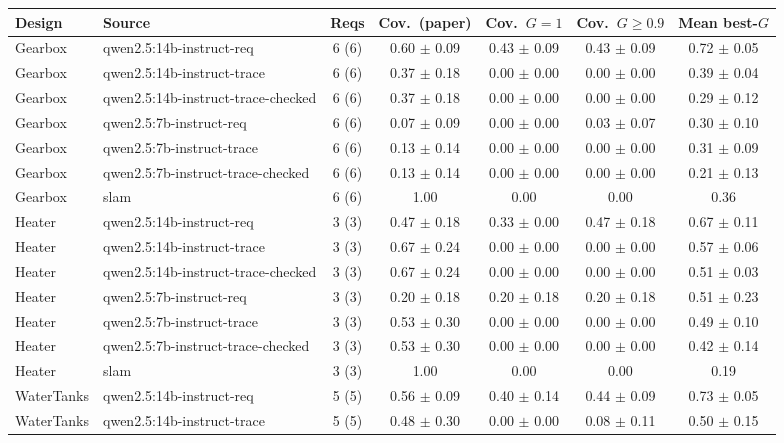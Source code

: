 \begin{tabular}{llccccc}
\toprule
Design & Source & Reqs & Cov.\ (paper) & Cov.\ $G{=}1$ & Cov.\ $G{\geq}0.9$ & Mean best-$G$ \\
\midrule
Gearbox & qwen2.5:14b-instruct-req & 6 (6) & 0.60 $\pm$ 0.09 & 0.43 $\pm$ 0.09 & 0.43 $\pm$ 0.09 & 0.72 $\pm$ 0.05 \\
Gearbox & qwen2.5:14b-instruct-trace & 6 (6) & 0.37 $\pm$ 0.18 & 0.00 $\pm$ 0.00 & 0.00 $\pm$ 0.00 & 0.39 $\pm$ 0.04 \\
Gearbox & qwen2.5:14b-instruct-trace-checked & 6 (6) & 0.37 $\pm$ 0.18 & 0.00 $\pm$ 0.00 & 0.00 $\pm$ 0.00 & 0.29 $\pm$ 0.12 \\
Gearbox & qwen2.5:7b-instruct-req & 6 (6) & 0.07 $\pm$ 0.09 & 0.00 $\pm$ 0.00 & 0.03 $\pm$ 0.07 & 0.30 $\pm$ 0.10 \\
Gearbox & qwen2.5:7b-instruct-trace & 6 (6) & 0.13 $\pm$ 0.14 & 0.00 $\pm$ 0.00 & 0.00 $\pm$ 0.00 & 0.31 $\pm$ 0.09 \\
Gearbox & qwen2.5:7b-instruct-trace-checked & 6 (6) & 0.13 $\pm$ 0.14 & 0.00 $\pm$ 0.00 & 0.00 $\pm$ 0.00 & 0.21 $\pm$ 0.13 \\
Gearbox & slam & 6 (6) & 1.00 & 0.00 & 0.00 & 0.36 \\
Heater & qwen2.5:14b-instruct-req & 3 (3) & 0.47 $\pm$ 0.18 & 0.33 $\pm$ 0.00 & 0.47 $\pm$ 0.18 & 0.67 $\pm$ 0.11 \\
Heater & qwen2.5:14b-instruct-trace & 3 (3) & 0.67 $\pm$ 0.24 & 0.00 $\pm$ 0.00 & 0.00 $\pm$ 0.00 & 0.57 $\pm$ 0.06 \\
Heater & qwen2.5:14b-instruct-trace-checked & 3 (3) & 0.67 $\pm$ 0.24 & 0.00 $\pm$ 0.00 & 0.00 $\pm$ 0.00 & 0.51 $\pm$ 0.03 \\
Heater & qwen2.5:7b-instruct-req & 3 (3) & 0.20 $\pm$ 0.18 & 0.20 $\pm$ 0.18 & 0.20 $\pm$ 0.18 & 0.51 $\pm$ 0.23 \\
Heater & qwen2.5:7b-instruct-trace & 3 (3) & 0.53 $\pm$ 0.30 & 0.00 $\pm$ 0.00 & 0.00 $\pm$ 0.00 & 0.49 $\pm$ 0.10 \\
Heater & qwen2.5:7b-instruct-trace-checked & 3 (3) & 0.53 $\pm$ 0.30 & 0.00 $\pm$ 0.00 & 0.00 $\pm$ 0.00 & 0.42 $\pm$ 0.14 \\
Heater & slam & 3 (3) & 1.00 & 0.00 & 0.00 & 0.19 \\
WaterTanks & qwen2.5:14b-instruct-req & 5 (5) & 0.56 $\pm$ 0.09 & 0.40 $\pm$ 0.14 & 0.44 $\pm$ 0.09 & 0.73 $\pm$ 0.05 \\
WaterTanks & qwen2.5:14b-instruct-trace & 5 (5) & 0.48 $\pm$ 0.30 & 0.00 $\pm$ 0.00 & 0.08 $\pm$ 0.11 & 0.50 $\pm$ 0.15 \\

\end{tabular}
